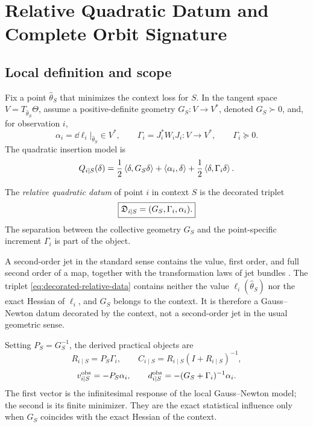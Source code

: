 \section{Relative Quadratic Datum and Complete Orbit Signature}
\subsection{Local definition and scope}
Fix a point $\widehat\theta_S$ that minimizes the context loss for $S$. In the tangent space $V=T_{\widehat\theta_S}\Theta$, assume a positive-definite geometry $G_S:V\to V^*$, denoted $G_S\succ0$, and, for observation $i$,
\begin{equation}
\alpha_i=\dd\ell_i|_{\widehat\theta_S}\in V^*,
\qquad
\Gamma_i=J_i^*W_iJ_i:V\to V^*,
\qquad \Gamma_i\succeq0.
\end{equation}
The quadratic insertion model is
\begin{equation}
Q_{i\mid S}(\delta)
=
\frac12\left\langle \delta,G_S\delta\right\rangle
+
\left\langle \alpha_i,\delta\right\rangle
+
\frac12\left\langle \delta,\Gamma_i\delta\right\rangle.
\label{eq:local-quadratic-model}
\end{equation}

\begin{definition}
The \emph{relative quadratic datum} of point $i$ in context $S$ is the decorated triplet
\begin{equation}
\boxed{\mathfrak D_{i\mid S}=(G_S,\Gamma_i,\alpha_i).}
\label{eq:decorated-relative-data}
\end{equation}
The separation between the collective geometry $G_S$ and the point-specific increment $\Gamma_i$ is part of the object.
\end{definition}

\begin{remark}
A second-order jet in the standard sense contains the value, first order, and full second order of a map, together with the transformation laws of jet bundles \citep{saunders1989}. The triplet \eqref{eq:decorated-relative-data} contains neither the value $\ell_i(\widehat\theta_S)$ nor the exact Hessian of $\ell_i$, and $G_S$ belongs to the context. It is therefore a Gauss--Newton datum decorated by the context, not a second-order jet in the usual geometric sense.
\end{remark}

Setting $P_S=G_S^{-1}$, the derived practical objects are
\begin{equation}
R_{i\mid S}=P_S\Gamma_i,
\qquad
C_{i\mid S}=R_{i\mid S}(I+R_{i\mid S})^{-1},
\label{eq:R-C}
\end{equation}
\begin{equation}
v_{i\mid S}^{\rm obs}=-P_S\alpha_i,
\qquad
d_{i\mid S}^{\rm obs}=-(G_S+\Gamma_i)^{-1}\alpha_i.
\label{eq:v-d}
\end{equation}
The first vector is the infinitesimal response of the local Gauss--Newton model; the second is its finite minimizer. They are the exact statistical influence only when $G_S$ coincides with the exact Hessian of the context.

